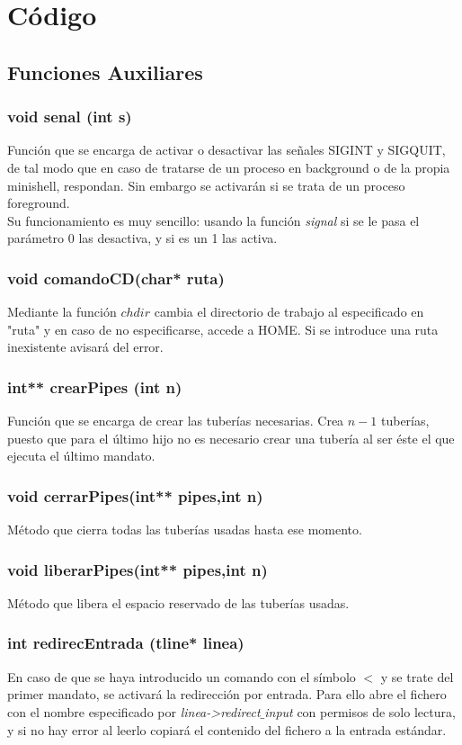 \chapter{Código}
\section{Funciones Auxiliares}
\subsection{void senal (int s)}
Función que se encarga de activar o desactivar las señales SIGINT y SIGQUIT, de tal modo que en caso de tratarse de un proceso en background o de la propia minishell, respondan. Sin embargo se activarán si se trata de un proceso foreground.\\
Su funcionamiento es muy sencillo: usando la función \textit{signal} si se le pasa el parámetro 0 las desactiva, y si es un 1 las activa.
\subsection{void comandoCD(char* ruta)}
Mediante la función $chdir$ cambia el directorio de trabajo al especificado en "ruta" y en caso de no especificarse, accede a HOME. Si se introduce una ruta inexistente avisará del error.
\subsection{int** crearPipes (int n)}
Función que se encarga de crear las tuberías necesarias. Crea $n-1$ tuberías, puesto que para el último hijo no es necesario crear una tubería al ser éste el que ejecuta el último mandato.
\subsection{void cerrarPipes(int** pipes,int n)}
Método que cierra todas las tuberías usadas hasta ese momento.
\subsection{void liberarPipes(int** pipes,int n)}
Método que libera el espacio reservado de las tuberías usadas.
\subsection{int redirecEntrada (tline* linea)}
En caso de que se haya introducido un comando con el símbolo $<$ y se trate del primer mandato, se activará la redirección por entrada. Para ello abre el fichero con el nombre especificado por \textit{linea->redirect$\_$input} con permisos de solo lectura, y si no hay error al leerlo copiará el contenido del fichero a la entrada estándar.
